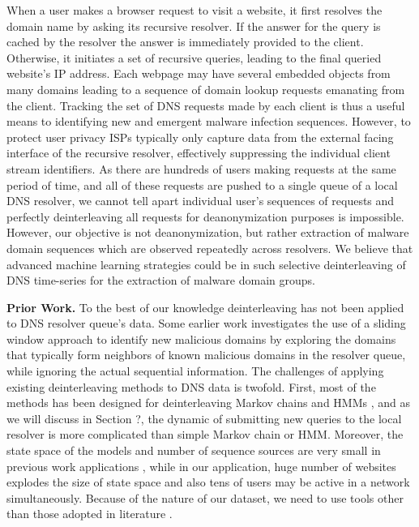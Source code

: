 	When a user makes a browser request to visit a website, it first
	resolves the domain name by asking its recursive resolver.  If the
	answer for the query is cached by the resolver the answer is
	immediately provided to the client. Otherwise, it initiates a set of
	recursive queries, leading to the final queried website's IP address.
	Each webpage may have several embedded objects from many domains
	leading to a sequence of domain lookup requests emanating from the
	client.  Tracking the set of DNS requests made by each client is thus
	a useful means to identifying new and emergent malware infection
	sequences.  However, to protect user privacy ISPs typically only
	capture data from the external facing interface of the recursive
	resolver, effectively suppressing the individual client stream
	identifiers.  As there are hundreds of users making requests at the
	same period of time, and all of these requests are pushed to a single
	queue of a local DNS resolver, we cannot tell apart individual user's
	sequences of requests and perfectly deinterleaving all requests for
	deanonymization purposes is impossible.  However, our objective is not
	deanonymization, but rather extraction of malware domain sequences
	which are observed repeatedly across resolvers.  We believe that advanced
	machine learning strategies could be  in such selective
	deinterleaving of DNS time-series for the extraction of malware
	domain groups.
	
	
	{\bf Prior Work. } To the best of our knowledge deinterleaving has not
	been applied to DNS resolver queue's data.  Some earlier
	work \cite{gao2013empirical} investigates the use of a sliding window
	approach to identify new malicious domains by exploring the domains
	that typically form neighbors of known malicious domains in the
	resolver queue, while ignoring the actual sequential information.  The
	challenges of applying existing deinterleaving methods to DNS data is
	twofold.  First, most of the methods has been designed for
	deinterleaving Markov chains \cite{batu2004inferring,
		seroussi2009deinterleaving, seroussi2012deinterleaving,
		minot2014separation} and HMMs \cite{landwehr2008modeling}, and as we
	will discuss in Section ?, the dynamic of submitting new queries to
	the local resolver is more complicated than simple Markov chain or
	HMM.  Moreover, the state space of the models and number of sequence
	sources are very small in previous work
	applications \cite{minot2014separation, landwehr2008modeling}, while
	in our application, huge number of websites explodes the size of state
	space and also tens of users may be active in a network
	simultaneously.  Because of the nature of our dataset, we need to use
	tools other than those adopted in
	literature \cite{minot2014separation,
		landwehr2008modeling,burge1998finding, burge1997prediction}.
	
